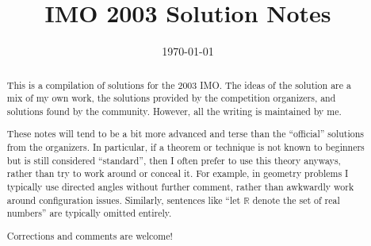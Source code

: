 \documentclass[11pt]{scrartcl}
\title{IMO 2003 Solution Notes}
\date{\today}
\begin{document}
\maketitle

\begin{abstract}
This is a compilation of solutions
for the 2003 IMO.
The ideas of the solution are a mix of my own work,
the solutions provided by the competition organizers,
and solutions found by the community.
However, all the writing is maintained by me.

These notes will tend to be a bit more advanced and terse than the ``official''
solutions from the organizers.
In particular, if a theorem or technique is not known to beginners
but is still considered ``standard'', then I often prefer to
use this theory anyways, rather than try to work around or conceal it.
For example, in geometry problems I typically use directed angles
without further comment, rather than awkwardly work around configuration issues.
Similarly, sentences like ``let $\mathbb{R}$ denote the set of real numbers''
are typically omitted entirely.

Corrections and comments are welcome!
\end{abstract}

\tableofcontents
\newpage

\addtocounter{section}{-1}
\end{document}
